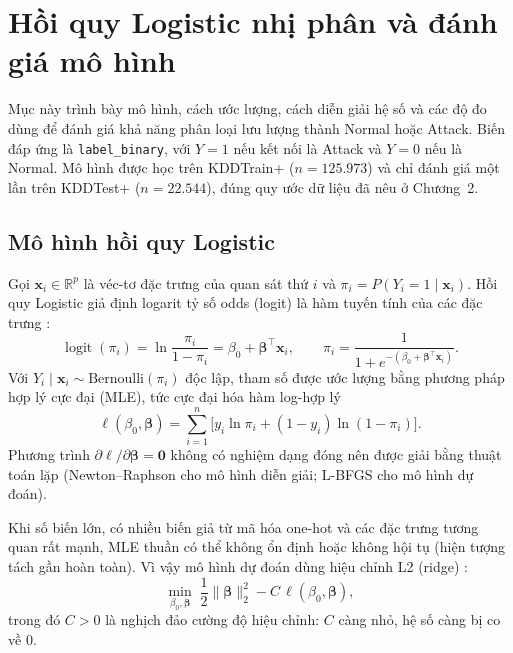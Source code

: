 \section{Hồi quy Logistic nhị phân và đánh giá mô hình}
\label{sec:t4:method}

Mục này trình bày mô hình, cách ước lượng, cách diễn giải hệ số và các độ đo dùng để đánh giá khả năng phân loại lưu lượng thành Normal hoặc Attack. Biến đáp ứng là \texttt{label\_binary}, với $Y=1$ nếu kết nối là Attack và $Y=0$ nếu là Normal. Mô hình được học trên KDDTrain+ ($n=125.973$) và chỉ đánh giá một lần trên KDDTest+ ($n=22.544$), đúng quy ước dữ liệu đã nêu ở Chương~2.

\subsection{Mô hình hồi quy Logistic}
Gọi $\mathbf{x}_i\in\mathbb{R}^p$ là véc-tơ đặc trưng của quan sát thứ $i$ và $\pi_i=P(Y_i=1\mid\mathbf{x}_i)$. Hồi quy Logistic giả định logarit tỷ số odds (logit) là hàm tuyến tính của các đặc trưng \cite{task4_hosmer2013,task4_agresti2013}:
\begin{equation}
\operatorname{logit}(\pi_i)=\ln\frac{\pi_i}{1-\pi_i}=\beta_0+\boldsymbol{\beta}^{\top}\mathbf{x}_i,
\qquad
\pi_i=\frac{1}{1+e^{-(\beta_0+\boldsymbol{\beta}^{\top}\mathbf{x}_i)}}.
\label{eq:t4:logit}
\end{equation}
Với $Y_i\mid\mathbf{x}_i\sim\text{Bernoulli}(\pi_i)$ độc lập, tham số được ước lượng bằng phương pháp hợp lý cực đại (MLE), tức cực đại hóa hàm log-hợp lý
\begin{equation}
\ell(\beta_0,\boldsymbol{\beta})=\sum_{i=1}^{n}\Big[y_i\ln\pi_i+(1-y_i)\ln(1-\pi_i)\Big].
\label{eq:t4:loglik}
\end{equation}
Phương trình $\partial\ell/\partial\boldsymbol\beta=\mathbf{0}$ không có nghiệm dạng đóng nên được giải bằng thuật toán lặp (Newton--Raphson cho mô hình diễn giải; L-BFGS cho mô hình dự đoán).

Khi số biến lớn, có nhiều biến giả từ mã hóa one-hot và các đặc trưng tương quan rất mạnh, MLE thuần có thể không ổn định hoặc không hội tụ (hiện tượng tách gần hoàn toàn). Vì vậy mô hình dự đoán dùng hiệu chỉnh L2 (ridge) \cite{task4_hastie2009,task4_sklearn2011}:
\begin{equation}
\min_{\beta_0,\boldsymbol\beta}\;\frac{1}{2}\lVert\boldsymbol\beta\rVert_2^2-C\,\ell(\beta_0,\boldsymbol\beta),
\label{eq:t4:l2}
\end{equation}
trong đó $C>0$ là nghịch đảo cường độ hiệu chỉnh: $C$ càng nhỏ, hệ số càng bị co về 0.


